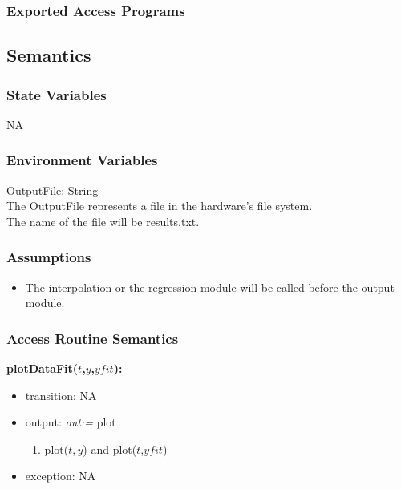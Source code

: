 \documentclass[12pt, titlepage]{article}
\begin{document}
\subsubsection{Exported Access Programs}

\subsection{Semantics}

\subsubsection{State Variables}
NA


\subsubsection{Environment Variables}


OutputFile: String\\

\noindent The OutputFile represents a file in the hardware's file system.\\

\noindent The name of the file will be results.txt.\\



\subsubsection{Assumptions}

\begin{itemize}
	
	\item The interpolation or the regression module will be called before the 
	output module.
	
\end{itemize}
\subsubsection{Access Routine Semantics}



\noindent \textbf{plotDataFit($t$,$y$,$yfit$):}
\begin{itemize}
	\item transition: NA 
	
	\item output: \textit{out:=} plot
		\begin{enumerate}
			\item plot($t,y$) and plot($t$,$yfit$)
		\end{enumerate}
	
	\item exception: NA
\end{itemize}
\end{document}
